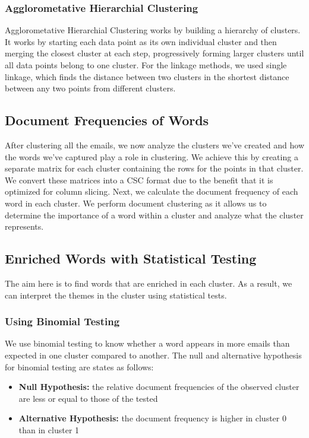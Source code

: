 \documentclass[a4paper, twocolumn]{article}
\begin{document}
\subsubsection{Agglorometative Hierarchial Clustering}
Agglorometative Hierarchial Clustering works by building a hierarchy of clusters. It works by starting each data point as its own individual cluster and then
merging the closest cluster at each step, progressively forming larger clusters until all data points belong to one cluster. For the linkage methods, we used
single linkage, which finds the distance between two clusters in the shortest distance between any two points from different clusters.

\subsection{Document Frequencies of Words}
After clustering all the emails, we now analyze the clusters we've created and how the words we've captured play a role in clustering. We achieve this by 
creating a separate matrix for each cluster containing the rows for the points in that cluster. We convert these matrices into a CSC format due to the benefit
that it is optimized for column slicing. Next, we calculate the document frequency of each word in each cluster. We perform document clustering as it allows
us to determine the importance of a word within a cluster and analyze what the cluster represents.

\subsection{Enriched Words with Statistical Testing}
The aim here is to find words that are enriched in each cluster. As a result, we can interpret the themes in the cluster using statistical tests. 

\subsubsection{Using Binomial Testing}
We use binomial testing to know whether a word appears in more emails than expected in one cluster compared to another. The null and alternative hypothesis 
for binomial testing are states as follows:

\begin{itemize}
    \item \textbf{Null Hypothesis:} the relative document frequencies of the observed cluster are less or equal to those of the tested
    \item \textbf{Alternative Hypothesis:} the document frequency is higher in cluster 0 than in cluster 1
\end{itemize}
\end{document}
